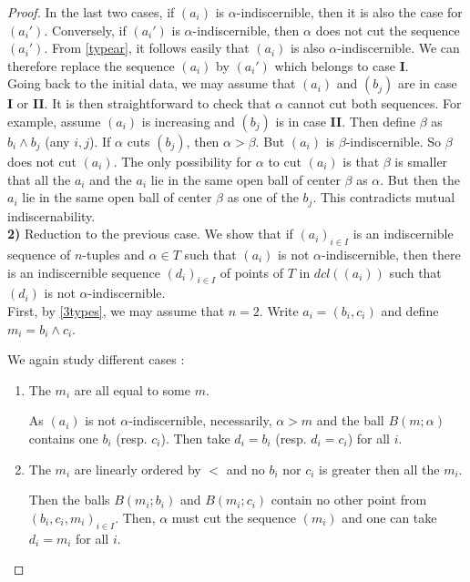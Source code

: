 \documentclass[english]{article}
\theoremstyle{definition}
\theoremstyle{mystyle}
\theoremstyle{remark}
\begin{document}
\begin{proof}
In the last two cases, if $(a_i)$ is $\alpha$-indiscernible, then it is also the case for $(a_i')$. Conversely, if $(a_i')$ is $\alpha$-indiscernible, then $\alpha$ does not cut the sequence $(a_i')$. From \ref{typear}, it follows easily that $(a_i)$ is also $\alpha$-indiscernible. We can therefore replace the sequence $(a_i)$ by $(a_i')$ which belongs to case \textbf{I}.
\\

Going back to the initial data, we may assume that $(a_i)$ and $(b_j)$ are in case \textbf{I} or \textbf{II}. It is then straightforward to check that $\alpha$ cannot cut both sequences. For example, assume $(a_i)$ is increasing and $(b_j)$ is in case \textbf{II}. Then define $\beta$ as $b_i \wedge b_j$ (any $i,j$). If $\alpha$ cuts $(b_j)$, then $\alpha > \beta$. But $(a_i)$ is $\beta$-indiscernible. So $\beta$ does not cut $(a_i)$. The only possibility for $\alpha$ to cut $(a_i)$ is that $\beta$ is smaller that all the $a_i$ and the $a_i$ lie in the same open ball of center $\beta$ as $\alpha$. But then the $a_i$ lie in the same open ball of center $\beta$ as one of the $b_j$. This contradicts mutual indiscernability.
\\

\textbf{2)} Reduction to the previous case. We show that if $(a_i)_{i\in I}$ is an indiscernible sequence of $n$-tuples and $\alpha \in T$ such that $(a_i)$ is not $\alpha$-indiscernible, then there is an indiscernible sequence $(d_i)_{i \in I}$ of points of $T$ in $dcl((a_i))$ such that $(d_i)$ is not $\alpha$-indiscernible.
\\

First, by \ref{3types}, we may assume that $n=2$. Write $a_i = (b_i,c_i)$ and define $m_i = b_i \wedge c_i$.

We again study different cases : 
\begin{enumerate}
\item The $m_i$ are all equal to some $m$.

As $(a_i)$ is not $\alpha$-indiscernible, necessarily, $\alpha > m$ and the ball $B(m;\alpha)$ contains one $b_i$ (resp. $c_i$). Then take $d_i=b_i$ (resp. $d_i=c_i$) for all $i$.

\item The $m_i$ are linearly ordered by $<$ and no $b_i$ nor $c_i$ is greater then all the $m_i$.

Then the balls $B(m_i; b_i)$ and $B(m_i; c_i)$ contain no other point from $(b_i,c_i,m_i)_{i \in I}$. Then, $\alpha$ must cut the sequence $(m_i)$ and one can take $d_i = m_i$ for all $i$.


\end{enumerate}
\end{proof}
\end{document}
